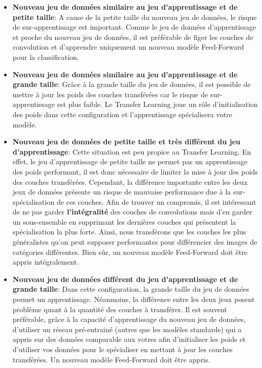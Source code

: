 \begin{itemize}
    \item \textbf{Nouveau jeu de données similaire au jeu d'apprentissage et de petite taille}: A cause de la petite taille du nouveau jeu de données, le risque de sur-apprentissage est important. Comme le jeu de données d'apprentissage et proche du nouveau jeu de données, il est préférable de figer les couches de convolution et d'apprendre uniquement un nouveau modèle Feed-Forward pour la classification.

    \item \textbf{Nouveau jeu de données similaire au jeu d'apprentissage et de grande taille}: Grâce à la grande taille du jeu de données, il est possible de mettre à jour les poids des couches transférées car le risque de sur-apprentissage est plus faible. Le Transfer Learning joue un rôle d'initialisation des poids dans cette configuration et l'apprentissage spécialisera votre modèle.

    \item \textbf{Nouveau jeu de données de petite taille et très différent du jeu d'apprentissage}: Cette situation est peu  propice au Transfer Learning. En effet, le jeu d'apprentissage de petite taille ne permet pas un apprentissage des poids performant, il est donc nécessaire de limiter la mise à jour des poids des couches transférées. Cependant, la différence importante entre les deux jeux de données présente un risque de mauvaise performance due à la sur-spécialisation de ces couches. Afin de trouver un compromis, il est intéressant de ne pas garder \textbf{l'intégralité} des couches de convolutions mais d'en garder un sous-ensemble en supprimant les dernières couches qui présentent la spécialisation la plus forte. Ainsi, nous transférons que les couches les plus généralistes qu'on peut supposer performantes pour différencier des images de catégories différentes. Bien sûr, un nouveau modèle Feed-Forward doit être appris intégralement.

    \item \textbf{Nouveau jeu de données différent du jeu d'apprentissage et de grande taille}: Dans cette configuration, la grande taille du jeu de données permet un apprentissage. Néanmoins, la différence entre les deux jeux posent problème quant à la quantité des couches à transférer. Il est souvent préférable, grâce à la capacité d'apprentissage du nouveau jeu de données, d'utiliser un réseau pré-entrainé (autres que les modèles standards) qui a appris sur des données comparable aux votres afin d'initialiser les poids et d'utiliser vos données pour le spécialiser en mettant à jour les couches transférées. Un nouveau modèle Feed-Forward doit être appris.
\end{itemize}

